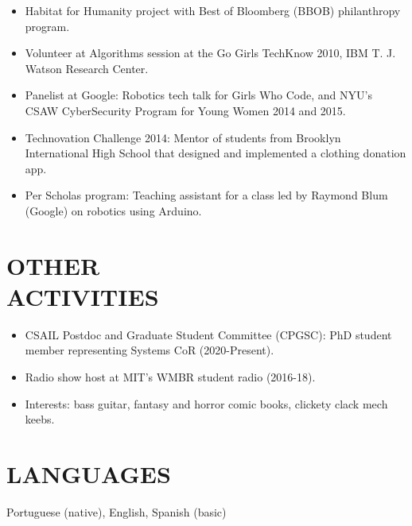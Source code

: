 \documentclass[line,margin]{res}
\begin{document}
\begin{resume}
\begin{itemize}
  \item Habitat for Humanity project with Best of Bloomberg (BBOB) philanthropy program.
  \item Volunteer at Algorithms session at the Go Girls TechKnow 2010, IBM T. J. Watson Research Center.
  \item Panelist at Google: Robotics tech talk for Girls Who Code, and NYU's CSAW CyberSecurity Program for Young Women 2014 and 2015.
  \item Technovation Challenge 2014: Mentor of students from Brooklyn International High School that designed and implemented a clothing donation app.
  \item Per Scholas program: Teaching assistant for a class led by Raymond Blum (Google) on robotics using Arduino.
  \end{itemize}

\section{OTHER \\ ACTIVITIES}
  \begin{itemize}  \itemsep -2pt
  \item CSAIL Postdoc and Graduate Student Committee (CPGSC): PhD student member representing Systems CoR (2020-Present).
  \item Radio show host at MIT's WMBR student radio (2016-18).
  \item Interests: bass guitar, fantasy and horror comic books, clickety clack mech keebs.
  \end{itemize}

\section{LANGUAGES}
Portuguese (native), English, Spanish (basic)

\end{resume}
\end{document}
